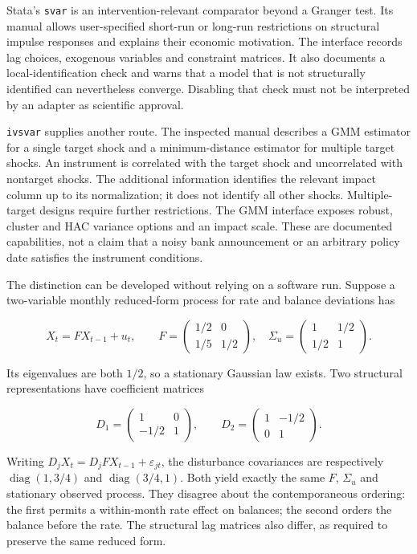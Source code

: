 Stata's \texttt{svar} is an intervention-relevant comparator beyond a
Granger test. Its manual allows user-specified short-run or long-run
restrictions on structural impulse responses and explains their economic
motivation. The interface records lag choices, exogenous variables and
constraint matrices. It also documents a local-identification check and
warns that a model that is not structurally identified can nevertheless
converge. Disabling that check must not be interpreted by an adapter as
scientific approval. \citep{exec13_ct_stata_svar}

\texttt{ivsvar} supplies another route. The inspected manual describes a
GMM estimator for a single target shock and a minimum-distance estimator
for multiple target shocks. An instrument is correlated with the target
shock and uncorrelated with nontarget shocks. The additional information
identifies the relevant impact column up to its normalization; it does
not identify all other shocks. Multiple-target designs require further
restrictions. The GMM interface exposes robust, cluster and HAC variance
options and an impact scale. These are documented capabilities, not a
claim that a noisy bank announcement or an arbitrary policy date
satisfies the instrument conditions.~\citep{exec13_ct_stata_ivsvar}

The distinction can be developed without relying on a software run.
Suppose a two-variable monthly reduced-form process for rate and balance
deviations has

\[
 X_t=FX_{t-1}+u_t,\qquad
 F=\begin{pmatrix}1/2&0\\1/5&1/2\end{pmatrix},\quad
 \Sigma_u=\begin{pmatrix}1&1/2\\1/2&1\end{pmatrix}.
\]

Its eigenvalues are both \(1/2\), so a stationary Gaussian law exists.
Two structural representations have coefficient matrices

\[
 D_1=\begin{pmatrix}1&0\\-1/2&1\end{pmatrix},\qquad
 D_2=\begin{pmatrix}1&-1/2\\0&1\end{pmatrix}.
\]

Writing \(D_jX_t=D_jFX_{t-1}+\varepsilon_{jt}\), the disturbance
covariances are respectively \(\operatorname{diag}(1,3/4)\) and
\(\operatorname{diag}(3/4,1)\). Both yield exactly the same \(F\),
\(\Sigma_u\) and stationary observed process. They disagree about the
contemporaneous ordering: the first permits a within-month rate effect
on balances; the second orders the balance before the rate. The
structural lag matrices also differ, as required to preserve the same
reduced form.

